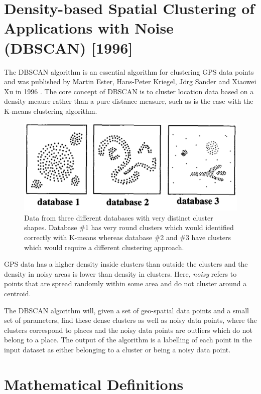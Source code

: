 \section{Density-based Spatial Clustering of Applications with Noise (DBSCAN) [1996]}
The DBSCAN algorithm is an essential algorithm for clustering GPS data points and was published by Martin Ester, Hans-Peter Kriegel, Jörg Sander and Xiaowei Xu in 1996 \cite{density-based-1996}. The core concept of DBSCAN is to cluster location data based on a density meaure rather than a pure distance measure, such as is the case with the K-means clustering algorithm. 

\begin{figure}
    \centering
    \includegraphics[width=\textwidth]{images/dbscan-clusters.png}
    \caption{Data from three different databases with very distinct cluster shapes. Database \#1 has very round clusters which would identified correctly with K-means whereas database \#2 and \#3 have clusters which would require a different clustering approach.}
    \label{fig:my_label}
\end{figure}

GPS data has a higher density inside clusters than outside the clusters and the density in noisy areas is lower than density in clusters. Here, \textit{noisy} refers to points that are spread randomly within some area and do not cluster around a centroid.

The DBSCAN algorithm will, given a set of geo-spatial data points and a small set of parameters, find these dense clusters as well as noisy data points, where the clusters correspond to places and the noisy data points are outliers which do not belong to a place. The output of the algorithm is a labelling of each point in the input dataset as either belonging to a cluster or being a noisy data point.

\section{Mathematical Definitions}

